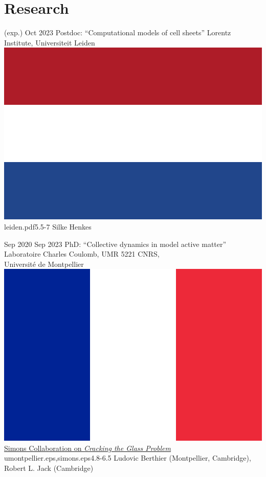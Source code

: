 \documentclass[letterpaper]{cvtemplate_en} %
\begin{document}
\makeprofile %


\vspace{2mm}
\section{Research}

\begin{cvbody}

\cvitem
	{{\tiny (exp.)} Oct 2023}
	{}
  {Postdoc: ``Computational models of cell sheets''}
  {Lorentz Institute, Universiteit Leiden \includegraphics[height=0.8\myheight]{nl}}
  {leiden.pdf}{5.5}{-7}
	{Silke Henkes}
  {\\}

\cvitem
	{Sep 2020}
	{Sep 2023}
  {PhD: ``Collective dynamics in model active matter''}
  {Laboratoire Charles Coulomb, UMR 5221 CNRS,\\ Universit\'e de Montpellier \includegraphics[height=0.8\myheight]{fr}\\
  \href{https://scglass.uchicago.edu}{Simons Collaboration on \textit{Cracking the Glass Problem}}}
  {umontpellier.eps,simons.eps}{4.8}{-6.5}
	{Ludovic Berthier (Montpellier, Cambridge),\\ Robert L. Jack (Cambridge)}
  {\\}

\end{cvbody}
\end{document}
